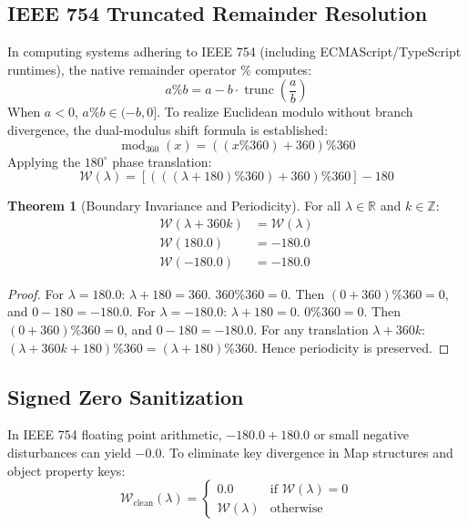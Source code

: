 \documentclass[11pt,a4paper]{article}
\theoremstyle{definition}
\newtheorem{theorem}{Theorem}
\begin{document}
\subsection{IEEE 754 Truncated Remainder Resolution}
In computing systems adhering to IEEE 754 (including ECMAScript/TypeScript runtimes), the native remainder operator $\%$ computes:
\begin{equation}
a \% b = a - b \cdot \operatorname{trunc}\left(\frac{a}{b}\right)
\end{equation}
When $a < 0$, $a \% b \in (-b, 0]$. To realize Euclidean modulo without branch divergence, the dual-modulus shift formula is established:
\begin{equation}
\operatorname{mod}_{360}(x) = \left( (x \% 360) + 360 \right) \% 360
\end{equation}
Applying the $180^\circ$ phase translation:
\begin{equation}
\mathcal{W}(\lambda) = \left[ \left( ((\lambda + 180) \% 360) + 360 \right) \% 360 \right] - 180
\end{equation}

\begin{theorem}[Boundary Invariance and Periodicity]
For all $\lambda \in \mathbb{R}$ and $k \in \mathbb{Z}$:
\begin{align}
\mathcal{W}(\lambda + 360 k) &= \mathcal{W}(\lambda) \\
\mathcal{W}(180.0) &= -180.0 \\
\mathcal{W}(-180.0) &= -180.0
\end{align}
\end{theorem}

\begin{proof}
For $\lambda = 180.0$:
$\lambda + 180 = 360$. $360 \% 360 = 0$. Then $(0 + 360) \% 360 = 0$, and $0 - 180 = -180.0$.
For $\lambda = -180.0$:
$\lambda + 180 = 0$. $0 \% 360 = 0$. Then $(0 + 360) \% 360 = 0$, and $0 - 180 = -180.0$.
For any translation $\lambda + 360 k$:
$(\lambda + 360 k + 180) \% 360 = (\lambda + 180) \% 360$. Hence periodicity is preserved.
\end{proof}

\subsection{Signed Zero Sanitization}
In IEEE 754 floating point arithmetic, $-180.0 + 180.0$ or small negative disturbances can yield $-0.0$. To eliminate key divergence in Map structures and object property keys:
\begin{equation}
\mathcal{W}_{\text{clean}}(\lambda) = 
\begin{cases} 
0.0 & \text{if } \mathcal{W}(\lambda) = 0 \\
\mathcal{W}(\lambda) & \text{otherwise}
\end{cases}
\end{equation}
\end{document}

